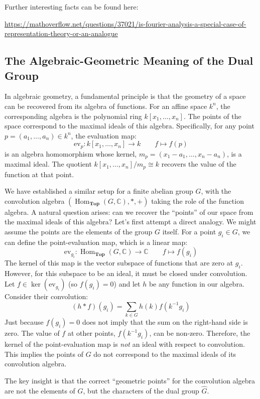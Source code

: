 \documentclass{article}
\newcommand{\Top}{{\textbf{Top}}}
\newcommand{\Hom}{{\operatorname{Hom}}}
\begin{document}
Further interesting facts can be found here:


\url{https://mathoverflow.net/questions/37021/is-fourier-analysis-a-special-case-of-representation-theory-or-an-analogue}

\subsection{The Algebraic-Geometric Meaning of the Dual Group}

In algebraic geometry, a fundamental principle is that the geometry of a space can be recovered from its algebra of functions. For an affine space $k^n$, the corresponding algebra is the polynomial ring $k[x_1, \dots, x_n]$. The points of the space correspond to the maximal ideals of this algebra. Specifically, for any point $p=(a_1, \dots, a_n) \in k^n$, the evaluation map:
\[
\text{ev}_p: k[x_1, \dots, x_n] \to k \qquad f \mapsto f(p)
\]
is an algebra homomorphism whose kernel, $m_p = ( x_1-a_1, \dots, x_n-a_n )$, is a maximal ideal. The quotient $k[x_1, \dots, x_n]/m_p \cong k$ recovers the value of the function at that point.

We have established a similar setup for a finite abelian group $G$, with the convolution algebra
$(\Hom_\Top(G, \mathbb{C}), *, +)$ taking the role of the function algebra. A natural question arises: can we
recover the ``points'' of our space from the maximal ideals of this algebra? Let's first attempt a direct
analogy. We might assume the points are the elements of the group $G$ itself. For a point $g_i \in G$, we
can define the point-evaluation map, which is a linear map:
\[
\text{ev}_{g_i}: \Hom_\Top(G, \mathbb{C}) \to \mathbb{C} \qquad f \mapsto f(g_i)
\]
The kernel of this map is the vector subspace of functions that are zero at $g_i$. However, for this subspace to be an ideal, it must be closed under convolution. Let $f \in \ker(\text{ev}_{g_i})$ (so $f(g_i)=0$) and let $h$ be any function in our algebra. Consider their convolution:
\[
(h * f)(g_i) = \sum_{k \in G} h(k)f(k^{-1}g_i)
\]
Just because $f(g_i)=0$ does not imply that the sum on the right-hand side is zero. The value of $f$ at other points, $f(k^{-1}g_i)$, can be non-zero. Therefore, the kernel of the point-evaluation map is \emph{not} an ideal with respect to convolution. This implies the points of $G$ do not correspond to the maximal ideals of its convolution algebra.

The key insight is that the correct ``geometric points'' for the convolution algebra are not the elements of $G$, but the characters of the dual group $\widehat{G}$.
\end{document}
